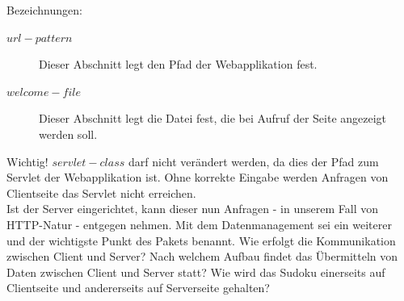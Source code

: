 \documentclass[a4paper,12pt]{scrreprt}
\begin{document}
	Bezeichnungen:
	\begin{description}
		\item[$url-pattern$] Dieser Abschnitt legt den Pfad der Webapplikation fest.
		\item[$welcome-file$] Dieser Abschnitt legt die Datei fest, die bei Aufruf der Seite angezeigt werden soll.
	\end{description}
	Wichtig! $servlet-class$ darf nicht ver\"andert werden, da dies der Pfad zum Servlet der Webapplikation ist.
	Ohne korrekte Eingabe werden Anfragen von Clientseite das Servlet nicht erreichen.\medskip \\
	Ist der Server eingerichtet, kann dieser nun Anfragen - in unserem Fall von HTTP-Natur - entgegen
	nehmen. Mit dem Datenmanagement sei ein weiterer und der wichtigste Punkt des Pakets benannt.
	Wie erfolgt die Kommunikation zwischen Client und Server? Nach welchem Aufbau findet das
	\"Ubermitteln von Daten zwischen Client und Server statt? Wie wird das Sudoku einerseits auf
	Clientseite und andererseits auf Serverseite gehalten?
\end{document}

